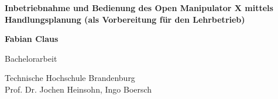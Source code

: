 \begin{titlepage}
    \begin{center}
        \vspace*{1cm}
            
        \Huge
        \textbf{Inbetriebnahme und Bedienung des Open Manipulator X mittels Handlungsplanung (als Vorbereitung für den Lehrbetrieb)}
            
        \vspace{0.5cm}
        \LARGE
        
            
        \vspace{1.5cm}
            
        \textbf{Fabian Claus}\\
            
        \vfill
            
       Bachelorarbeit
            
        \vspace{0.8cm}
            
            
        \Large
        Technische Hochschule Brandenburg\\
        Prof. Dr. Jochen Heinsohn, Ingo Boersch\\
            
    \end{center}
\end{titlepage}
\thispagestyle{empty}